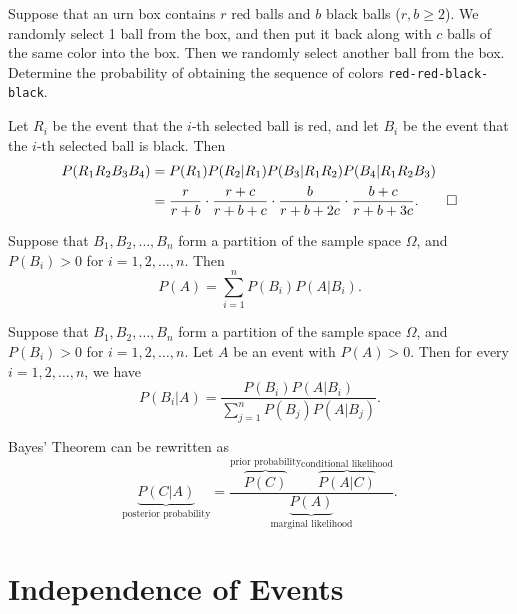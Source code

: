 \begin{example}
  Suppose that an urn box contains $r$ red balls and $b$ black balls ($r, b \geq 2$). We randomly select 1 ball from the box, and then put it back along with $c$ balls of the same color into the box. Then we randomly select another ball from the box. Determine the probability of obtaining the sequence of colors \texttt{red-red-black-black}.
\end{example}

\begin{solution}
  Let \(R_i\) be the event that the \(i\)-th selected ball is red, and let \(B_i\) be the event that the \(i\)-th selected ball is black. Then
  \begin{align*}
    P(R_1 R_2 B_3 B_4) & = P(R_1) P(R_2 \vert R_1) P(B_3 \vert R_1 R_2) P(B_4 \vert R_1 R_2 B_3) \\
                       & = \frac{r}{r + b} \cdot \frac{r + c}{r + b + c} \cdot \frac{b}{r + b + 2c} \cdot \frac{b + c}{r + b + 3c}. \qedhere
  \end{align*}
\end{solution}

\begin{theorem}
  Suppose that \(B_1, B_2, \dots, B_n\) form a partition of the sample space \(\Omega\), and \(P(B_i) > 0\) for \(i = 1, 2, \dots, n\). Then
  \[
    P(A) = \sum_{i=1}^n P(B_i) P(A \vert B_i).
  \]
\end{theorem}

\begin{theorem}
  Suppose that \(B_1, B_2, \dots, B_n\) form a partition of the sample space \(\Omega\), and \(P(B_i) > 0\) for \(i = 1, 2, \dots, n\). Let \(A\) be an event with \(P(A) > 0\). Then for every \(i = 1, 2, \dots, n\), we have
  \[
    P(B_i \vert A) = \frac{P(B_i) P(A \vert B_i)}{\sum_{j=1}^n P(B_j) P(A \vert B_j)}.
  \]
\end{theorem}

Bayes' Theorem can be rewritten as
\[
  \underbrace{P(C \vert A)}_{\text{posterior probability}} = \frac{\overbrace{P(C)}^{\text{prior probability}} \overbrace{P(A \vert C)}^{\text{conditional likelihood}}}{\underbrace{P(A)}_{\text{marginal likelihood}}}.
\]

\section{Independence of Events}


